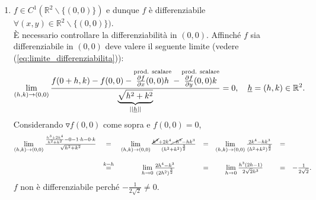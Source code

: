\begin{example}
\begin{enumerate}
		\item $f\in C^1(\mathbb{R}^2\backslash\{(0,0)\})$ e dunque $f$ è differenziabile $\forall(x,y)\in\mathbb{R}^2\backslash\{(0,0)\})$.\\
		È necessario controllare la differenziabilità in $(0,0)$. Affinché $f$ sia differenziabile in $(0,0)$  deve valere il seguente limite (vedere (\ref{eq:limite_differenziabilita})):
		\begin{equation*}
			\lim\limits_{(h,k)\rightarrow(0,0)} \frac{f(0+h, k)-f(0,0)-\overset{\text{prod. scalare}}{\frac{\partial f}{\partial x}(0,0)h} -\overset{\text{prod. scalare}}{\frac{\partial f}{\partial y}(0,0) k}}{\underbrace{\sqrt{h^2+k^2}}_{||\uline h||}} = 0, \quad \uline{h} =(h, k)\in\mathbb{R}^2.
		\end{equation*}
		Considerando $\triangledown f(0,0)$ come sopra e $f(0,0)=0$,
		\begin{equation*}
			\begin{matrix}
				\lim\limits_{(h,k)\rightarrow(0,0)}\frac{\frac{h^3 + 2k^4}{h^2+k^2} - 0 - 1\cdot h - 0\cdot k}{\sqrt{h^2+k^2}} &=& \lim\limits_{(h,k)\rightarrow(0,0)}\frac{\cancel{h^3} + 2k^4 \cancel{-h^3} - h k^3}{(h^2 + k^2)^\frac{3}{2}} &=& \lim\limits_{(h,k)\rightarrow(0,0)}\frac{2k^4-hk^3}{(h^2 + k^2)^\frac{3}{2}} &=&\\\\
				&\overset{k=h}{=}& \lim\limits_{h\rightarrow 0}\frac{2h^4-h^3}{(2h^2)^{\frac{3}{2}}} &=& \lim\limits_{h\rightarrow 0} \frac{h^3(2h-1)}{2\sqrt{2}h^3} &=& -\frac{1}{2\sqrt{2}}.
			\end{matrix}
		\end{equation*}
		$f$ non è differenziabile perché $-\frac{1}{2\sqrt{2}} \neq 0$.

\end{enumerate}
\end{example}
